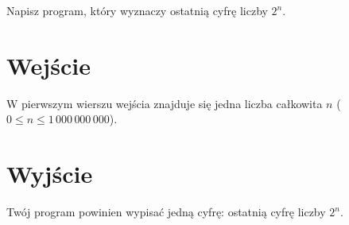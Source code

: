 \documentclass{spiral-kurs}
\begin{document}
\makeheader
%
    Napisz program, który wyznaczy ostatnią cyfrę liczby $2^n$.

    \section{Wejście}
    W pierwszym wierszu wejścia znajduje się jedna liczba całkowita $n$
    ($0 \le n \le 1\,000\,000\,000$).
      
    \section{Wyjście}
    Twój program powinien wypisać jedną cyfrę: ostatnią cyfrę liczby $2^n$.



  
\end{document}
